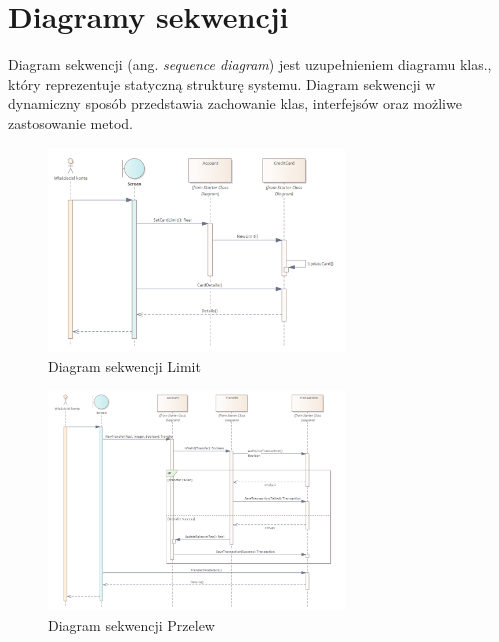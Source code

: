 \section{Diagramy sekwencji}
Diagram sekwencji (ang. \textit{sequence diagram}) jest uzupełnieniem diagramu klas., który reprezentuje statyczną strukturę systemu. Diagram sekwencji w dynamiczny sposób przedstawia zachowanie klas, interfejsów oraz możliwe zastosowanie metod.
\begin{figure}[H]
	\centering
	\includegraphics[width=0.7\textwidth]{images/Limit.png}
	\caption{Diagram sekwencji Limit}
	\label{fig:Seq1}
\end{figure}
\begin{figure}[H]
	\centering
	\includegraphics[width=0.7\textwidth]{images/Przelew.png}
	\caption{Diagram sekwencji Przelew}
	\label{fig:Seq2}
\end{figure}